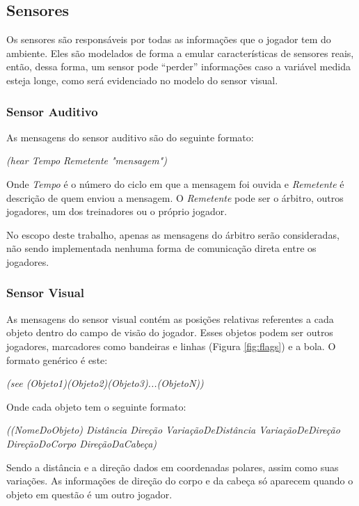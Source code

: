 \subsection{Sensores}
\par Os sensores são responsáveis por todas as informações que o jogador tem do ambiente. Eles são modelados de forma a emular características de sensores reais, então, dessa forma, um sensor pode ``perder'' informações caso a variável medida esteja longe, como será evidenciado no modelo do sensor visual.
\subsubsection{Sensor Auditivo}

As mensagens do sensor auditivo são do seguinte formato:

\textit{(hear Tempo Remetente "mensagem")}

Onde \textit{Tempo} é o número do ciclo em que a mensagem foi ouvida e \textit{Remetente} é descrição de quem enviou a mensagem. O \textit{Remetente} pode ser o árbitro, outros jogadores, um dos treinadores ou o próprio jogador.

No escopo deste trabalho, apenas as mensagens do árbitro serão consideradas, não sendo implementada nenhuma forma de comunicação direta entre os jogadores.

\subsubsection{Sensor Visual}
\label{sec:visual}
As mensagens do sensor visual contém as posições relativas referentes a cada objeto dentro do campo de visão do jogador. Esses objetos podem ser outros jogadores, marcadores como bandeiras e linhas (Figura \ref{fig:flags}) e a bola. O formato genérico é este:

\textit{(see (Objeto1)(Objeto2)(Objeto3)...(ObjetoN))}

Onde cada objeto tem o seguinte formato:

\textit{((NomeDoObjeto) Distância Direção VariaçãoDeDistância VariaçãoDeDireção DireçãoDoCorpo DireçãoDaCabeça)}

Sendo a distância e a direção dados em coordenadas polares, assim como suas variações. As informações de direção do corpo e da cabeça só aparecem quando o objeto em questão é um outro jogador.

